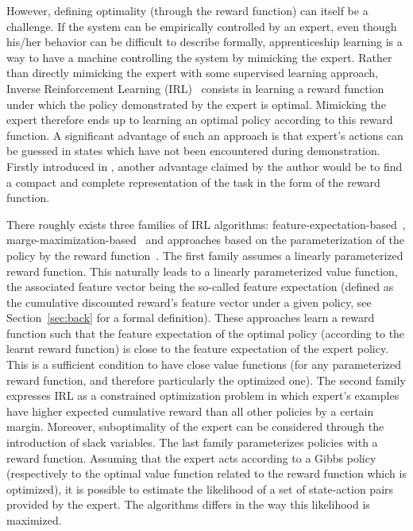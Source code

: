 \documentclass{jfpda2011}
\begin{document}
However, defining optimality (through the reward function) can
itself be a challenge. If the system can be empirically controlled
by an expert, even though his/her behavior can be difficult to
describe formally, apprenticeship learning is a way to have a
machine controlling the system by mimicking the expert. Rather than
directly mimicking the expert with some supervised learning
approach, Inverse Reinforcement Learning (IRL)~\citep{ng2000algorithms}
consists in learning a reward function under which the policy
demonstrated by the expert is optimal. Mimicking the expert therefore
ends up to learning an optimal policy according to this reward
function. A significant advantage of such an approach is that
expert's actions can be guessed in states which have not been
encountered during demonstration. Firstly introduced in \citep{russell1998learning}, another advantage claimed by the author would be to
find a compact and complete representation of the task in the form
of the reward function.

There roughly exists three families of IRL algorithms:
feature-expectation-based~\citep{abbeel2004apprenticeship,syed2008apprenticeship,syed2008game,ziebart2008maximum},
marge-maximization-based~\citep{ratliff2006maximum,ratliff2007imitation,ratliff2007boosting,kolter2008hierarchical}
and approaches based on the parameterization of the policy by the
reward function~\citep{ramachandran2007bayesian,neu2007apprenticeship}. The first family
assumes a linearly parameterized reward function. This naturally
leads to a linearly parameterized value function, the associated
feature vector being the so-called feature expectation (defined as
the cumulative discounted reward's feature vector under a given
policy, see Section~\ref{sec:back} for a formal definition).
These approaches learn a reward function such that the feature
expectation of the optimal policy (according to the learnt reward
function) is close to the feature expectation of the expert policy.
This is a sufficient condition to have close value functions (for any parameterized reward function, and therefore particularly the optimized one). The
second family expresses IRL as a constrained optimization problem in
which expert's examples have higher expected cumulative reward than all other
policies by a certain margin. Moreover, suboptimality of the expert
can be considered through the introduction of slack variables. The
last family parameterizes policies with a reward function. Assuming
that the expert acts according to a Gibbs policy (respectively to
the optimal value function related to the reward function which is
optimized), it is possible to estimate the likelihood of a set of
state-action pairs provided by the expert. The algorithms differs in
the way this likelihood is maximized.
\end{document}
